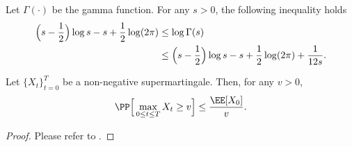 \documentclass[11pt]{article}
\begin{document}
\begin{lemma}
\label{lemma:stirling}
Let $\Gamma(\cdot)$ be the gamma function. For any $s>0$, the following inequality holds
\begin{align}
    \Big(s-\frac12\Big)\log s-s+\frac12\log(2\pi)
    &\leq
    \log\Gamma(s)
    \notag\\
    &\leq
    \Big(s-\frac12\Big)\log s-s+\frac12\log(2\pi)
    +\frac{1}{12s}.
\notag
\end{align}
\end{lemma}
\begin{lemma}
\label{lem:Ville}
Let $\{X_t\}_{t=0}^T$ be a non-negative supermartingale. Then, for any $v > 0$, 
\begin{align*}
    \PP\Big[\max_{0\le t \le T} X_t \ge v\Big] \le \frac{\EE[X_0]}{v}.
\end{align*}
\end{lemma}
\begin{proof}
    Please refer to \citet{durrett2019probability}.
\end{proof}


\end{document}
